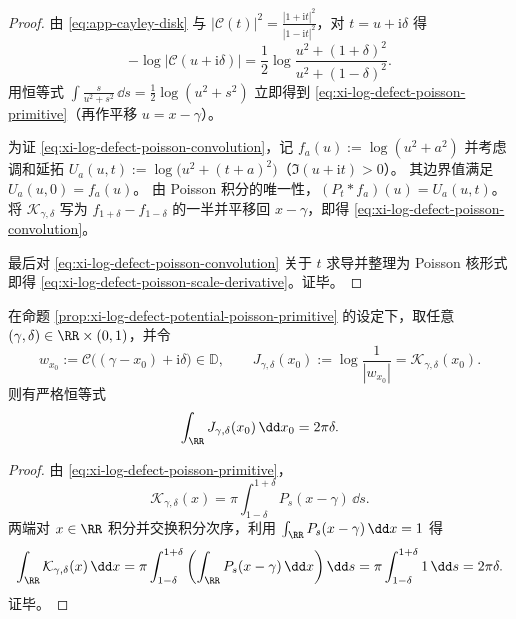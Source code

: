 \begin{proof}
由 \eqref{eq:app-cayley-disk} 与 \(|\mathcal{C}(t)|^2=\frac{|1+\mathrm{i}t|^2}{|1-\mathrm{i}t|^2}\)，对 \(t=u+\mathrm{i}\delta\) 得
\[
-\log|\mathcal{C}(u+\mathrm{i}\delta)|
=\frac12\log\frac{u^2+(1+\delta)^2}{u^2+(1-\delta)^2}.
\]
用恒等式 \(\int \frac{s}{u^2+s^2}\,\dd s=\frac12\log(u^2+s^2)\) 立即得到 \eqref{eq:xi-log-defect-poisson-primitive}（再作平移 \(u=x-\gamma\)）。
\par
为证 \eqref{eq:xi-log-defect-poisson-convolution}，记 \(f_a(u):=\log(u^2+a^2)\) 并考虑调和延拓
\(
U_a(u,t):=\log\bigl(u^2+(t+a)^2\bigr)
\)（\(\Im(u+\mathrm{i}t)>0\)）。
其边界值满足 \(U_a(u,0)=f_a(u)\)。
由 Poisson 积分的唯一性，\((P_t*f_a)(u)=U_a(u,t)\)。
将 \(\mathcal{K}_{\gamma,\delta}\) 写为 \(f_{1+\delta}-f_{1-\delta}\) 的一半并平移回 \(x-\gamma\)，即得 \eqref{eq:xi-log-defect-poisson-convolution}。
\par
最后对 \eqref{eq:xi-log-defect-poisson-convolution} 关于 \(t\) 求导并整理为 Poisson 核形式即得 \eqref{eq:xi-log-defect-poisson-scale-derivative}。证毕。
\end{proof}



\begin{theorem}\label{thm:xi-comoving-jensen-weight-integral-conservation}
在命题 \ref{prop:xi-log-defect-potential-poisson-primitive} 的设定下，取任意 \((\gamma,\delta)\in\RR\times(0,1)\)，并令
\[
w_{x_0}:=\mathcal{C}\bigl((\gamma-x_0)+\mathrm{i}\delta\bigr)\in\mathbb{D},
\qquad
J_{\gamma,\delta}(x_0):=\log\frac{1}{|w_{x_0}|}=\mathcal{K}_{\gamma,\delta}(x_0).
\]
则有严格恒等式
\[
\int_{\RR}J_{\gamma,\delta}(x_0)\,\dd x_0=2\pi\delta.
\]
\end{theorem}
\begin{proof}
由 \eqref{eq:xi-log-defect-poisson-primitive}，
\[
\mathcal{K}_{\gamma,\delta}(x)=\pi\int_{1-\delta}^{1+\delta}P_s(x-\gamma)\,\dd s.
\]
两端对 \(x\in\RR\) 积分并交换积分次序，利用 \(\int_{\RR}P_s(x-\gamma)\,\dd x=1\) 得
\[
\int_{\RR}\mathcal{K}_{\gamma,\delta}(x)\,\dd x
=\pi\int_{1-\delta}^{1+\delta}\left(\int_{\RR}P_s(x-\gamma)\,\dd x\right)\dd s
=\pi\int_{1-\delta}^{1+\delta}1\,\dd s
=2\pi\delta.
\]
证毕。
\end{proof}

